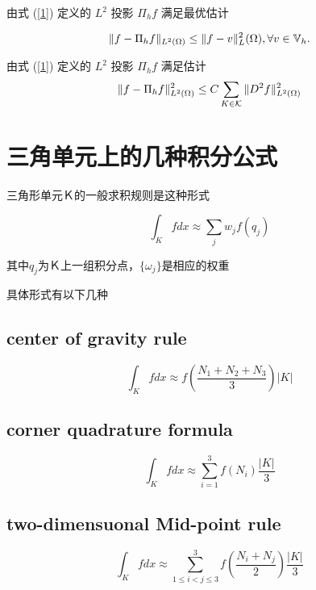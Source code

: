 \documentclass{article}
\begin{document}
\begin{theorem}
    由式 (\ref{1}) 定义的 $L^2$ 投影 $\Pi_h f$ 满足最优估计
    
    \begin{equation}
        \| f - \Pi_h f\|_{L^2(\Omega)} \le \|f - v\|_L^2(\Omega), 
        \forall v \in {\mathbb V}_h.
    \end{equation}
\end{theorem}


\begin{theorem}
   由式 (\ref{1}) 定义的 $L^2$ 投影 $\Pi_h f$  满足估计    
    \begin{equation}
        \| f - \Pi_h f\|^2_{L^2(\Omega)} \le C 
        \sum_{K\in {\mathcal K}}\|D^2 f\|^2_{L^2(\Omega)}
    \end{equation}
\end{theorem}

\section{三角单元上的几种积分公式}

三角形单元Ｋ的一般求积规则是这种形式

\begin{equation}
\int_{K} f d x \approx \sum_{j} w_{j} f\left(q_{j}\right)
\end{equation}

其中$q_{j}$为Ｋ上一组积分点，$\{\omega_j\}$是相应的权重

具体形式有以下几种

\subsection{center of gravity rule}
\begin{equation}
\int_{K} f d x \approx f\left(\frac{N_{1}+N_{2}+N_{3}}{3}\right)|K|
\end{equation}

\subsection{corner quadrature formula}
\begin{equation}
\int_{K} f d x \approx \sum_{i=1}^{3} f\left(N_{i}\right) \frac{|K|}{3}
\end{equation}

\subsection{two-dimensuonal Mid-point rule}
\begin{equation}
\int_{K} f d x \approx \sum_{1 \leq i<j \leq 3}^{3} f\left(\frac{N_{i}+N_{j}}{2}\right) \frac{|K|}{3}
\end{equation}
\end{document}
